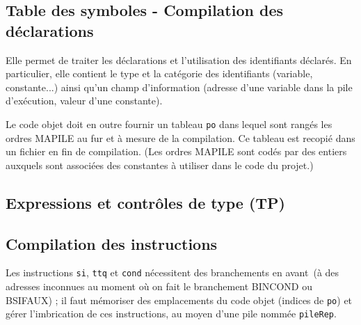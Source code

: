 \documentclass[a4paper]{article}
\begin{document}
\subsection{Table des symboles - Compilation des déclarations}

Elle permet de traiter les déclarations et l'utilisation des identifiants déclarés. En particulier, elle contient le type et la catégorie des identifiants (variable, constante...) ainsi qu'un champ d'information (adresse d'une variable dans la pile d'exécution, valeur d'une constante).

Le code objet doit en outre fournir un tableau \verb?po? dans lequel sont rangés les ordres MAPILE au fur et à mesure de la compilation. Ce tableau est recopié dans un fichier en fin de compilation. (Les ordres MAPILE sont codés par des entiers auxquels sont associées des constantes à utiliser dans le code du projet.)

\subsection{Expressions et contrôles de type (TP)}

\subsection{Compilation des instructions}

Les instructions \verb?si?, \verb?ttq? et \verb?cond? nécessitent des branchements \og en avant\fg\ (à des adresses inconnues au moment où on fait le branchement BINCOND ou BSIFAUX) ; il faut mémoriser des emplacements du code objet (indices de \verb?po?) et gérer l'imbrication de ces instructions, au moyen d'une pile nommée \verb?pileRep?.
\end{document}
